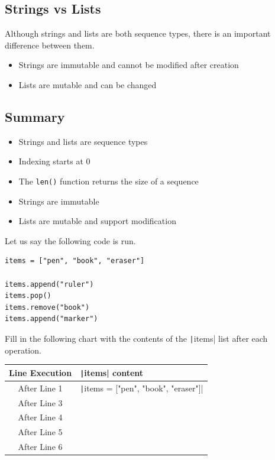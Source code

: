 \subsection{Strings vs Lists}

Although strings and lists are both sequence types, there is an important
difference between them.

\begin{itemize}
    \item {}Strings are immutable and cannot be modified after creation
    \item Lists are mutable and can be changed
\end{itemize}

\subsection{Summary}

\begin{itemize}
    \item Strings and lists are sequence types
    \item Indexing starts at 0
    \item The \texttt{len()} function returns the size of a sequence
    \item Strings are immutable
    \item Lists are mutable and support modification
\end{itemize}

\begin{Exercise}[label=lists1, title=What is in your backpack?]
Let us say the following code is run.
\begin{verbatim}
items = ["pen", "book", "eraser"]

items.append("ruler")
items.pop()
items.remove("book")
items.append("marker")
\end{verbatim}
Fill in the following chart with the contents of the \texttt|items| list after each operation.
\begin{tabular}{|c|p{}}
\hline
Line Execution & \texttt|items| content \\
\hline
After Line 1 & \texttt|items = ["pen", "book", "eraser"]| \\
\hline
After Line 3 & \\
\hline
After Line 4 & \\
\hline
After Line 5 & \\
\hline
After Line 6 & \\
\hline
\end{tabular}
\end{Exercise}

